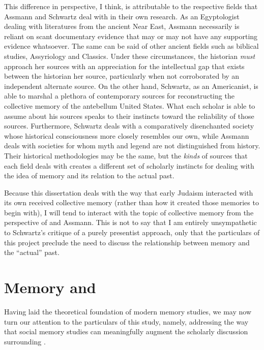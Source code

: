 This difference in perspective, I think, is attributable to the
respective fields that Assmann and Schwartz deal with in their own
research. As an Egyptologist dealing with literatures from the ancient
Near East, Assmann necessarily is reliant on scant documentary evidence
that may or may not have any supporting evidence whatsoever. The same
can be said of other ancient fields such as biblical studies,
Assyriology and Classics. Under these circumstances, the historian
\emph{must} approach her sources with an appreciation for the
intellectual gap that exists between the historian her source,
particularly when not corroborated by an independent alternate source.
On the other hand, Schwartz, as an Americanist, is able to marshal a
plethora of contemporary sources for reconstructing the collective
memory of the antebellum United States. What each scholar is able to
assume about his sources speaks to their instincts toward the
reliability of those sources. Furthermore, Schwartz deals with a
comparatively disenchanted society whose historical consciousness more
closely resembles our own, while Assmann deals with societies for whom
myth and legend are not distinguished from history. Their historical
methodologies may be the same, but the \emph{kinds} of sources that each
field deals with creates a different set of scholarly instincts for
dealing with the idea of memory and its relation to the actual past.

Because this dissertation deals with the way that early Judaism
interacted with its own received collective memory (rather than how it
created those memories to begin with), I will tend to interact with the
topic of collective memory from the perspective of
\halbwachs and Assmann. This is not to say that I am
entirely unsympathetic to Schwartz's critique of a purely presentist
approach, only that the particulars of this project preclude the need to
discuss the relationship between memory and the ``actual'' past.

\hypertarget{memory-and-rwb}{%
\section{Memory and \RwB}\label{memory-and-rwb}}

Having laid the theoretical foundation of modern memory studies, we may
now turn our attention to the particulars of this study, namely,
addressing the way that social memory studies can meaningfully augment
the scholarly discussion surrounding \rwb.\autocite[See
also][]{brooke_zsengeller2014}

